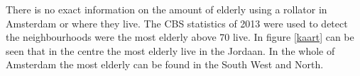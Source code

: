 There is no exact information on the amount of elderly using a rollator in Amsterdam or where they live. The CBS statistics of 2013 were used to detect the neighbourhoods were the most elderly above 70 live. In figure \ref{kaart} can be seen that in the centre the most elderly live in the Jordaan. In the whole of Amsterdam the most elderly can be found in the South West and North. 